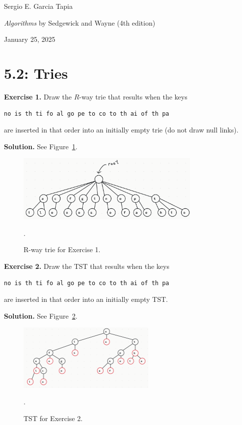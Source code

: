 \documentclass[12pt, a4paper]{article}
\newenvironment{ex}[2][Exercise]
{\par\medskip\noindent \textbf{#1 #2.}}
{\medskip}
\newenvironment{sol}[1][Solution]
{\par\medskip\noindent \textbf{#1.} }
{\medskip}
\begin{document}
	\noindent Sergio E. Garcia Tapia \hfill
	
	\noindent \emph{Algorithms} by Sedgewick and Wayne (4th edition) \cite{sedgewick_wayne}\hfill
	
	\noindent January 25, 2025\hfill 
	\section*{5.2: Tries}
	\begin{ex}{1}
		Draw the $R$-way trie that results when the keys
		\begin{lstlisting}[language={}]
			no is th ti fo al go pe to co to th ai of th pa
		\end{lstlisting}
		are inserted in that order into an initially empty trie (do not draw null links).
	\end{ex}
	\begin{sol}
		See Figure~\ref{fig:ex-01}.
		\begin{figure}
			\centering
			\includegraphics[width=0.8\textwidth]{exercise-01}
			\caption{R-way trie for Exercise 1.}
			\label{fig:ex-01}.
		\end{figure}
	\end{sol}
	\begin{ex}{2}
		Draw the TST that results when the keys
		\begin{lstlisting}[language={}]
			no is th ti fo al go pe to co to th ai of th pa
		\end{lstlisting}
		are inserted in that order into an initially empty TST.
	\end{ex}
	\begin{sol}
		See Figure~\ref{fig:ex-02}.
		\begin{figure}
			\centering
			\includegraphics[width=0.6\textwidth]{exercise-02}
			\caption{TST for Exercise 2.}
			\label{fig:ex-02}.
		\end{figure}
	\end{sol}
\end{document}
